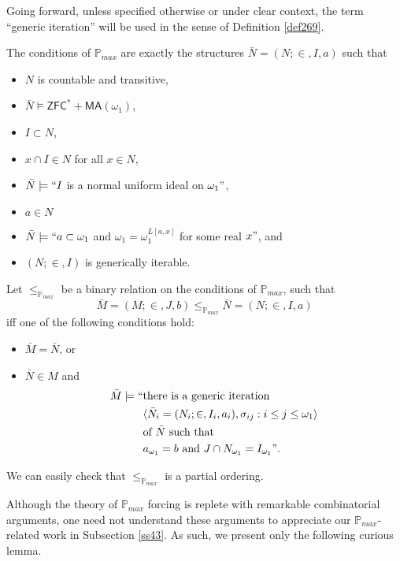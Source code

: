 \documentclass[12pt]{article}
\numberwithin{equation}{section}
\begin{document}
Going forward, unless specified otherwise or under clear context, the term ``generic iteration'' will be used in the sense of Definition \ref{def269}.

\begin{defi}\label{pmax}
The conditions of $\mathbb{P}_{max}$ are exactly the structures $\bar{N} = (N; \in, I, a)$ such that
\begin{itemize}
    \item $N$ is countable and transitive,
    \item $\bar{N} \models \mathsf{ZFC}^* + \mathsf{MA}(\omega_1)$,
    \item $I \subset N$,
    \item $x \cap I \in N$ for all $x \in N$,
    \item $\bar{N} \models ``I$ is a normal uniform ideal on $\omega_1"$, 
    \item $a \in N$
    \item $\bar{N} \models ``a \subset \omega_1$ and $\omega_1 = \omega_1^{L[a, x]}$ for some real $x"$, and
    \item $(N; \in, I)$ is generically iterable.
\end{itemize}
Let $\leq_{\mathbb{P}_{max}}$ be a binary relation on the conditions of $\mathbb{P}_{max}$, such that $$\bar{M} = (M; \in, J, b) \leq_{\mathbb{P}_{max}} \bar{N} = (N; \in, I, a)$$ iff one of the following conditions hold:
\begin{itemize}
    \item $\bar{M} = \bar{N}$, or 
    \item $\bar{N} \in M$ and
    \begin{align*}
        \bar{M} \models `` & \text{there is a generic iteration } \\ 
        & \langle \bar{N}_i = (N_i; \in, I_i, a_i), \sigma_{ij} : i \leq j \leq \omega_1 \rangle \\
        & \text{of } \bar{N} \text{ such that} \\
        & a_{\omega_1} = b \text{ and } J \cap N_{\omega_1} = I_{\omega_1}".
    \end{align*}
\end{itemize}
We can easily check that $\leq_{\mathbb{P}_{max}}$ is a partial ordering.
\end{defi}

Although the theory of $\mathbb{P}_{max}$ forcing is replete with remarkable combinatorial arguments, one need not understand these arguments to appreciate our $\mathbb{P}_{max}$-related work in Subsection \ref{ss43}. As such, we present only the following curious lemma.
\end{document}
